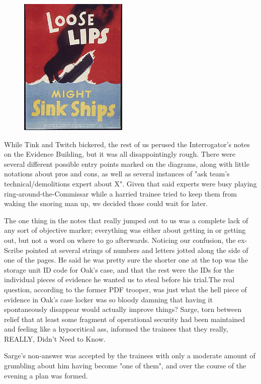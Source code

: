\begin{figure}
	\begin{center}
		\includegraphics[width=\figwidth]{pics/21/16.png}
	\end{center}
\end{figure}
While Tink and Twitch bickered, the rest of us perused the Interrogator's notes on the Evidence Building, but it was all disappointingly rough. 
There were several different possible entry points marked on the diagrams, along with little notations about pros and cons, as well as several instances of "ask team's technical/demolitions expert about X". 
Given that said experts were busy playing ring-around-the-Commissar while a harried trainee tried to keep them from waking the snoring man up, we decided those could wait for later. 


The one thing in the notes that really jumped out to us was a complete lack of any sort of objective marker; 
everything was either about getting in or getting out, but not a word on where to go afterwards. 
Noticing our confusion, the ex-Scribe pointed at several strings of numbers and letters jotted along the side of one of the pages. 
He said he was pretty sure the shorter one at the top was the storage unit ID code for Oak's case, and that the rest were the IDs for the individual pieces of evidence he wanted us to steal before his trial.The real question, according to the former PDF trooper, was just what the hell piece of evidence in Oak's case locker was so bloody damning that having it spontaneously disappear would actually improve things? 
Sarge, torn between relief that at least some fragment of operational security had been maintained and feeling like a hypocritical ass, informed the trainees that they really, REALLY, Didn't Need to Know.

Sarge's non-answer was accepted by the trainees with only a moderate amount of grumbling about him having become "one of them", and over the course of the evening a plan was formed. 


